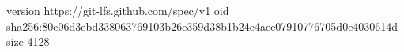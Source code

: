 version https://git-lfs.github.com/spec/v1
oid sha256:80e06d3ebd338063769103b26e359d38b1b24e4aee07910776705d0e4030614d
size 4128
